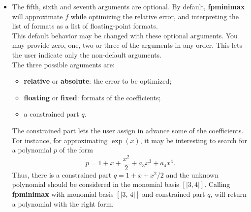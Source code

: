 \begin{itemize}
\item The fifth, sixth and seventh arguments are optional. By default, \textbf{fpminimax}
   will approximate $f$ while optimizing the relative error, and interpreting
   the list of formats as a list of floating-point formats.\\
   This default behavior may be changed with these optional arguments. You
   may provide zero, one, two or three of the arguments in any order.
   This lets the user indicate only the non-default arguments.\\
   The three possible arguments are: \begin{itemize}
   \item \textbf{relative} or \textbf{absolute}: the error to be optimized;
   \item \textbf{floating} or \textbf{fixed}: formats of the coefficients;
   \item a constrained part $q$.
   \end{itemize}
   The constrained part lets the user assign in advance some of the
   coefficients. For instance, for approximating $\exp(x)$, it may
   be interesting to search for a polynomial $p$ of the form
                   $$p = 1 + x + \frac{x^2}{2} + a_3 x^3 + a_4 x^4.$$
   Thus, there is a constrained part $q = 1 + x + x^2/2$ and the unknown
   polynomial should be considered in the monomial basis $[|3, 4|]$.
   Calling \textbf{fpminimax} with monomial basis $[|3,\,4|]$ and constrained
   part $q$, will return a polynomial with the right form.


\end{itemize}
